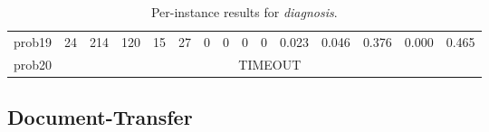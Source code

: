 \begin{table}[H]
{\begin{tabular}{lrrr rr rr rr rrrrr}
            prob19           & 24                                    & 214             & 120         & 15          & 27           & 0 & 0  & 0 & 0  & 0.023 & 0.046 & 0.376  & 0.000 & 0.465  \\
            prob20           & \multicolumn{14}{c}{TIMEOUT}                                                                                                                                   \\
            \bottomrule
        \end{tabular}%
    }
    \caption{Per-instance results for \textit{diagnosis}.}
    \label{tab:appendix_diagnosis}
\end{table}

\subsection{Document-Transfer}
\label{app:results_doctransfer}

